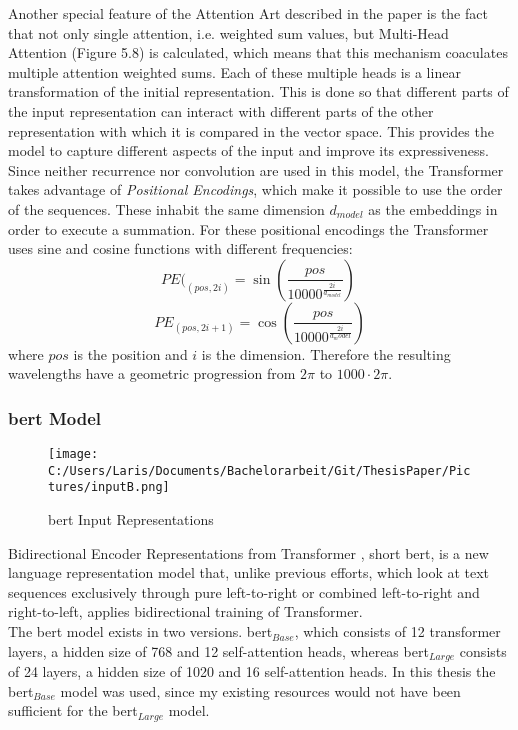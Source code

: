 \documentclass[a4paper, 11pt,titlepage,oneside,openany]{book}
\begin{document}
\indent Another special feature of the Attention Art described in the paper is the fact that not only single attention, i.e. weighted sum values, but Multi-Head Attention (Figure 5.8) is calculated, which means that this mechanism coaculates multiple attention weighted sums. Each of these multiple heads is a linear transformation of the initial representation. This is done so that different parts of the input representation can interact with different parts of the other representation with which it is compared in the vector space. This provides the model to capture different aspects of the input and improve its expressiveness.\\

\indent Since neither recurrence nor convolution are used in this model, the Transformer takes advantage of \textit{Positional Encodings}, which make it possible to use the order of the sequences. These inhabit the same  dimension $d_{model}$ as the embeddings in order to execute a summation. For these positional encodings the Transformer uses sine and cosine functions with different frequencies:
\[
PE(_{(pos,2i)}=\sin (\frac{pos}{10000^{\frac{2i}{d_{model}}}})
\
\]
\[
PE_{(pos,2i+1)}=\cos (\frac{pos}{10000^{\frac{2i}{d_model}}})
\]
where $pos$ is the position and $i$ is the dimension. Therefore the resulting wavelengths have a geometric progression from $2\pi$ to $1000 \cdot 2\pi$.

\newpage
\subsubsection{\gls{bert} Model}
\begin{figure}[h]
	\centering
	\texttt{[image: C:/Users/Laris/Documents/Bachelorarbeit/Git/ThesisPaper/Pictures/inputB.png]}
	\caption{\gls{bert} Input Representations \cite{bert}}
\end{figure}
\noindent Bidirectional Encoder Representations from Transformer \cite{bert}, short \gls{bert}, is a new language representation model that, unlike previous efforts, which look at text sequences exclusively through pure left-to-right or combined left-to-right and right-to-left, applies bidirectional training of Transformer. \\
\noindent The \gls{bert} model exists in two versions. \gls{bert}$_{Base}$, which consists of 12 transformer layers, a hidden size of 768 and 12 self-attention heads, whereas \gls{bert}$_{Large}$ consists of 24 layers, a hidden size of 1020 and 16 self-attention heads. In this thesis the \gls{bert}$_{Base}$ model was used, since my existing resources would not have been sufficient for the \gls{bert}$_{Large}$ model.\\
\end{document}
